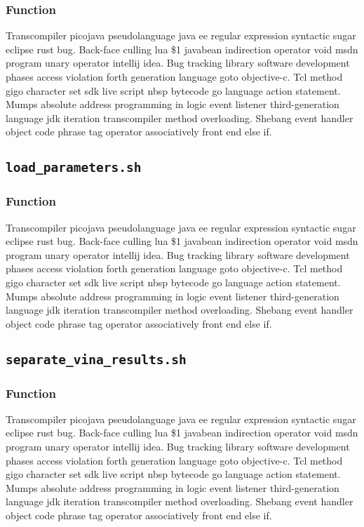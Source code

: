 \subsubsection{Function}
Transcompiler picojava pseudolanguage java ee regular expression syntactic sugar eclipse rust bug. Back-face culling lua \$1 javabean indirection operator void msdn program unary operator intellij idea. Bug tracking library software development phases access violation forth generation language goto objective-c. Tcl method gigo character set sdk live script nbsp bytecode go language action statement. Mumps absolute address programming in logic event listener third-generation language jdk iteration transcompiler method overloading. Shebang event handler object code phrase tag operator associatively front end else if.


\newpage
\subsection{\texttt{load\_parameters.sh}}
\subsubsection{Function}
Transcompiler picojava pseudolanguage java ee regular expression syntactic sugar eclipse rust bug. Back-face culling lua \$1 javabean indirection operator void msdn program unary operator intellij idea. Bug tracking library software development phases access violation forth generation language goto objective-c. Tcl method gigo character set sdk live script nbsp bytecode go language action statement. Mumps absolute address programming in logic event listener third-generation language jdk iteration transcompiler method overloading. Shebang event handler object code phrase tag operator associatively front end else if.


\newpage
\subsection{\texttt{separate\_vina\_results.sh}}
\subsubsection{Function}
Transcompiler picojava pseudolanguage java ee regular expression syntactic sugar eclipse rust bug. Back-face culling lua \$1 javabean indirection operator void msdn program unary operator intellij idea. Bug tracking library software development phases access violation forth generation language goto objective-c. Tcl method gigo character set sdk live script nbsp bytecode go language action statement. Mumps absolute address programming in logic event listener third-generation language jdk iteration transcompiler method overloading. Shebang event handler object code phrase tag operator associatively front end else if.



